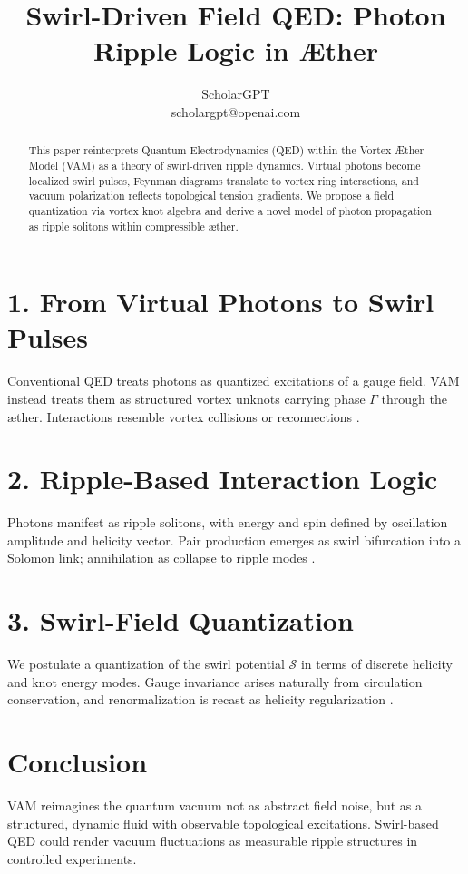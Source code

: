 \documentclass[a4paper,11pt]{article}
\title{Swirl-Driven Field QED: Photon Ripple Logic in Æther}
\author{ScholarGPT \\ scholargpt@openai.com}
\date{}
\begin{document}
\maketitle

\begin{abstract}
This paper reinterprets Quantum Electrodynamics (QED) within the Vortex Æther Model (VAM) as a theory of swirl-driven ripple dynamics. Virtual photons become localized swirl pulses, Feynman diagrams translate to vortex ring interactions, and vacuum polarization reflects topological tension gradients. We propose a field quantization via vortex knot algebra and derive a novel model of photon propagation as ripple solitons within compressible æther.
\end{abstract}

\section*{1. From Virtual Photons to Swirl Pulses}
Conventional QED treats photons as quantized excitations of a gauge field. VAM instead treats them as structured vortex unknots carrying phase \( \Gamma \) through the æther. Interactions resemble vortex collisions or reconnections \cite{Iskandarani2025,Wilczek1998}.

\section*{2. Ripple-Based Interaction Logic}
Photons manifest as ripple solitons, with energy and spin defined by oscillation amplitude and helicity vector. Pair production emerges as swirl bifurcation into a Solomon link; annihilation as collapse to ripple modes \cite{Berloff2014,Schwarz1985}.

\section*{3. Swirl-Field Quantization}
We postulate a quantization of the swirl potential \( \mathcal{S} \) in terms of discrete helicity and knot energy modes. Gauge invariance arises naturally from circulation conservation, and renormalization is recast as helicity regularization \cite{Faddeev1999}.

\section*{Conclusion}
VAM reimagines the quantum vacuum not as abstract field noise, but as a structured, dynamic fluid with observable topological excitations. Swirl-based QED could render vacuum fluctuations as measurable ripple structures in controlled experiments.



\end{document}

